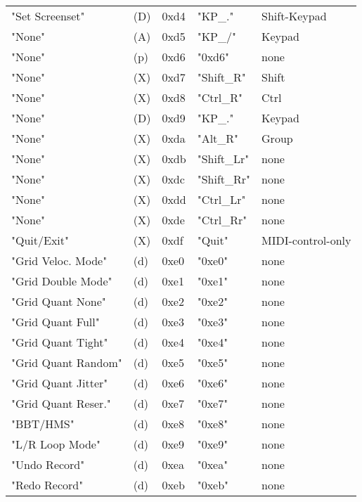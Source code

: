 \begin{table}[htb]
\begin{tabular}{l l l l l}
        "Set Screenset"      & (D)  &  0xd4   & "KP\_."      &  Shift-Keypad \\
        "None"               & (A)  &  0xd5   & "KP\_/"      &  Keypad \\
        "None"               & (p)  &  0xd6   & "0xd6"       & none \\
        "None"               & (X)  &  0xd7   & "Shift\_R"   &  Shift \\
        "None"               & (X)  &  0xd8   & "Ctrl\_R"    &  Ctrl \\
        "None"               & (D)  &  0xd9   & "KP\_."      &  Keypad \\
        "None"               & (X)  &  0xda   & "Alt\_R"     &  Group \\
        "None"               & (X)  &  0xdb   & "Shift\_Lr"  &  none \\
        "None"               & (X)  &  0xdc   & "Shift\_Rr"  &  none \\
        "None"               & (X)  &  0xdd   & "Ctrl\_Lr"   &  none \\
        "None"               & (X)  &  0xde   & "Ctrl\_Rr"   &  none \\
        "Quit/Exit"          & (X)  &  0xdf   & "Quit"       & MIDI-control-only \\
        "Grid Veloc. Mode"   & (d)  &  0xe0   & "0xe0"       & none \\
        "Grid Double Mode"   & (d)  &  0xe1   & "0xe1"       & none \\
        "Grid Quant None"    & (d)  &  0xe2   & "0xe2"       & none \\
        "Grid Quant Full"    & (d)  &  0xe3   & "0xe3"       & none \\
        "Grid Quant Tight"   & (d)  &  0xe4   & "0xe4"       & none \\
        "Grid Quant Random"  & (d)  &  0xe5   & "0xe5"       & none \\
        "Grid Quant Jitter"  & (d)  &  0xe6   & "0xe6"       & none \\
        "Grid Quant Reser."  & (d)  &  0xe7   & "0xe7"       & none \\
        "BBT/HMS"            & (d)  &  0xe8   & "0xe8"       & none \\
        "L/R Loop Mode"      & (d)  &  0xe9   & "0xe9"       & none \\
        "Undo Record"        & (d)  &  0xea   & "0xea"       & none \\
        "Redo Record"        & (d)  &  0xeb   & "0xeb"       & none \\

\end{tabular}
\end{table}
